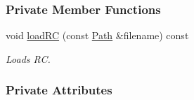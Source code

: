 \subsubsection*{Private Member Functions}
\begin{DoxyCompactItemize}
\item 
void \hyperlink{group__edeiedei_gafbe3ba880d64b341f6cbe684648479ec}{loadRC} (const \hyperlink{classPath}{Path} \&filename) const 
\begin{DoxyCompactList}\small\item\em Loads RC. \item\end{DoxyCompactList}\end{DoxyCompactItemize}
\subsubsection*{Private Attributes}
